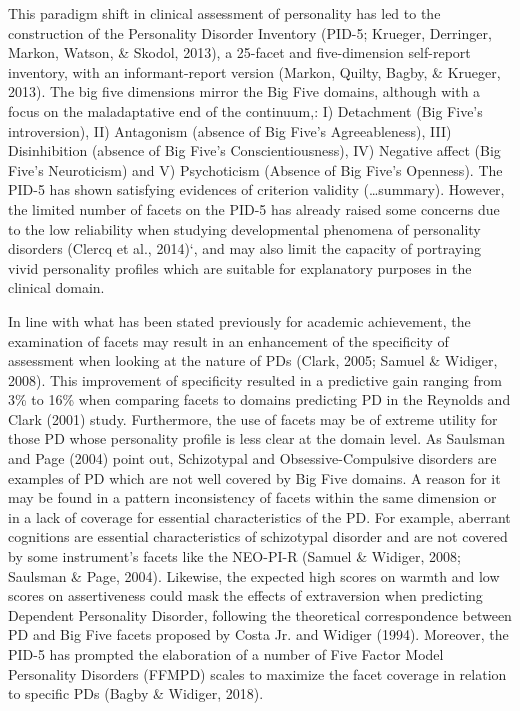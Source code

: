 \documentclass[,man,floatsintext]{apa6}
\theoremstyle{definition}
\theoremstyle{definition}
\theoremstyle{definition}
\theoremstyle{remark}
\begin{document}
This paradigm shift in clinical assessment of personality has led to the
construction of the Personality Disorder Inventory (PID-5; Krueger,
Derringer, Markon, Watson, \& Skodol, 2013), a 25-facet and
five-dimension self-report inventory, with an informant-report version
(Markon, Quilty, Bagby, \& Krueger, 2013). The big five dimensions
mirror the Big Five domains, although with a focus on the maladaptative
end of the continuum,: I) Detachment (Big Five's introversion), II)
Antagonism (absence of Big Five's Agreeableness), III) Disinhibition
(absence of Big Five's Conscientiousness), IV) Negative affect (Big
Five's Neuroticism) and V) Psychoticism (Absence of Big Five's
Openness). The PID-5 has shown satisfying evidences of criterion
validity (\ldots{}summary). However, the limited number of facets on the
PID-5 has already raised some concerns due to the low reliability when
studying developmental phenomena of personality disorders (Clercq et
al., 2014)`, and may also limit the capacity of portraying vivid
personality profiles which are suitable for explanatory purposes in the
clinical domain.

In line with what has been stated previously for academic achievement,
the examination of facets may result in an enhancement of the
specificity of assessment when looking at the nature of PDs (Clark,
2005; Samuel \& Widiger, 2008). This improvement of specificity resulted
in a predictive gain ranging from 3\% to 16\% when comparing facets to
domains predicting PD in the Reynolds and Clark (2001) study.
Furthermore, the use of facets may be of extreme utility for those PD
whose personality profile is less clear at the domain level. As Saulsman
and Page (2004) point out, Schizotypal and Obsessive-Compulsive
disorders are examples of PD which are not well covered by Big Five
domains. A reason for it may be found in a pattern inconsistency of
facets within the same dimension or in a lack of coverage for essential
characteristics of the PD. For example, aberrant cognitions are
essential characteristics of schizotypal disorder and are not covered by
some instrument's facets like the NEO-PI-R (Samuel \& Widiger, 2008;
Saulsman \& Page, 2004). Likewise, the expected high scores on warmth
and low scores on assertiveness could mask the effects of extraversion
when predicting Dependent Personality Disorder, following the
theoretical correspondence between PD and Big Five facets proposed by
Costa Jr. and Widiger (1994). Moreover, the PID-5 has prompted the
elaboration of a number of Five Factor Model Personality Disorders
(FFMPD) scales to maximize the facet coverage in relation to specific
PDs (Bagby \& Widiger, 2018).
\end{document}
